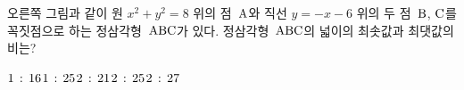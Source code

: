 \noindent\begin{minipage}[t]{0.58\linewidth}\vspace{0pt}\raggedright 오른쪽 그림과 같이 원 $x^2+y^2=8$ 위의 점~$\mathrm{A}$와 직선 $y=-x-6$ 위의 두 점~$\mathrm{B}$, $\mathrm{C}$를 꼭짓점으로 하는 정삼각형~$\mathrm{ABC}$가 있다. 정삼각형~$\mathrm{ABC}$의 넓이의 최솟값과 최댓값의 비는?\end{minipage}\hfill\begin{minipage}[t]{0.4\linewidth}\vspace{0pt}\centering \resizebox{\ifdim\width>\linewidth\linewidth\else\width\fi}{!}{}\end{minipage}\par
\begin{choices32}{$1\mkern3mu :\mkern3mu 16$}{$1\mkern3mu :\mkern3mu 25$}{$2\mkern3mu :\mkern3mu 21$}{$2\mkern3mu :\mkern3mu 25$}{$2\mkern3mu :\mkern3mu 27$}\end{choices32}
